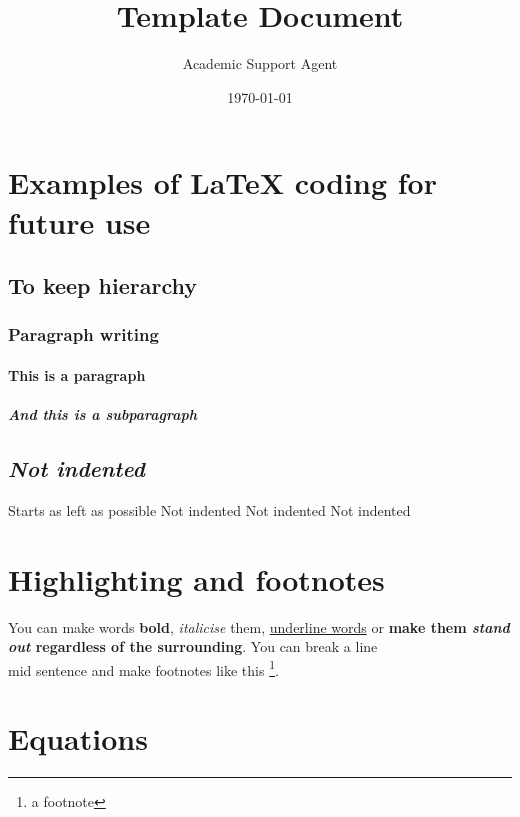 \documentclass{article}
\title{Template Document}
\author{Academic Support Agent}
\date{\today}
\begin{document}
\maketitle

\maketitle



\setcounter{page}{1}

\section{Examples of LaTeX coding for future use}
\subsection{To keep hierarchy}
\subsubsection{Paragraph writing}

\paragraph{This is a paragraph}
\lipsum[2]

\subparagraph{And this is a subparagraph}
\lipsum[3]

\subsection{\textit{Not indented}}

\noindent Starts as left as possible Not indented Not indented Not indented

\section{Highlighting and footnotes}
You can make words \textbf{bold}, \textit{italicise} them, \underline{underline words} or \textbf{make them \emph{stand out} regardless of the surrounding}. You can break a line\\ mid sentence and make footnotes like this \footnote{a footnote}.

\section{Equations}
\end{document}
